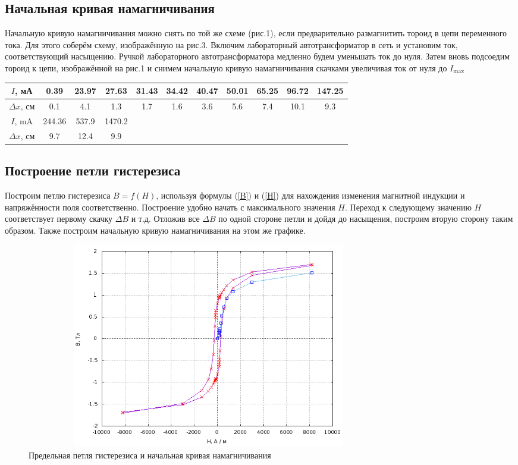 \documentclass[12pt]{article}
\begin{document}
\subsection*{Начальная кривая намагничивания}
\par
	Начальную кривую намагничивания можно снять по той же схеме (рис.1), если предварительно размагнитить тороид в цепи переменного тока. Для этого соберём схему, изображённую на рис.3. Включим лабораторный автотрансформатор в сеть и установим ток, соответствующий насыщению. Ручкой лабораторного автотрансформатора медленно будем уменьшать ток до нуля. Затем вновь подсоедим тороид к цепи, изображённой на рис.1 и снимем начальную кривую намагничивания скачками увеличивая ток от нуля до $I_\text{max}$ 	
\begin{table}[h!]
	\centering
	\begin{tabular}{|c|c|c|c|c|c|c|c|c|c|c|}
	\hline
		$I$, мА & 0.39 & 23.97 & 27.63 & 31.43 & 34.42 & 40.47 & 50.01 & 65.25 & 96.72 & 147.25\\
	\hline
		$\Delta x$, см & 0.1 & 4.1 & 1.3 & 1.7 & 1.6 & 3.6 & 5.6 & 7.4 & 10.1 & 9.3\\
	\hline	
	   $I$, mA & 244.36 & 537.9 & 1470.2 \\	   
	\cline{1-4}
		$\Delta x$, см & 9.7 & 12.4 & 9.9\\		  
	\cline{1-4}
	\end{tabular}
\end{table}
\subsection*{Построение петли гистерезиса}
\par
	Построим петлю гистерезиса $B = f(H)$, используя формулы (\ref{B}) и (\ref{H}) для нахождения изменения магнитной индукции и напряжённости поля соответственно. Построение удобно начать с максимального значения $H$. Переход к следующему значению $H$ соответствует первому скачку $\Delta B$ и т.д. Отложив все $\Delta B$ по одной стороне петли и дойдя до насыщения, построим вторую сторону таким образом. Также построим начальную кривую намагничивания на этом же графике.
	\begin{figure}[h!]
		\centering
		\includegraphics[height = 9cm, width = 16cm]{plot1.png}
		\caption{Предельная петля гистерезиса и начальная кривая намагничивания}
	\end{figure}
\end{document}
